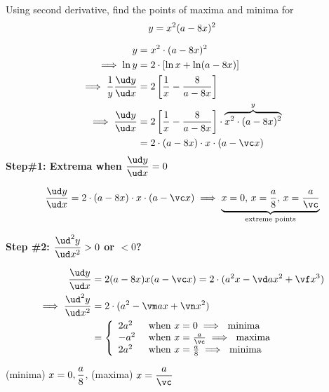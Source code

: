 

\MULTIPLY{}\vc
\MULTIPLY{}\vd
\MULTIPLY{}\vm
\SQUARE\vb\ve
\MULTIPLY{}\vf
\MULTIPLY{}\vn

\question[3] Using second derivative, find the points of maxima and minima for 
  \[ y=x^2(a-8 x)^2 \]

\watchout

\ifprintanswers
\fi 

\begin{solution}[\fullpage]
  \begin{align}
     y &= x^2\cdot(a-\vb x)^2 \\
     \implies \ln y &= 2\cdot \left[\ln x + \ln (a-\vb x)\right] \\
     \implies \dfrac{1}{y}\dfrac{\ud y}{\ud x} &= 2\left[ \dfrac{1}{x} - \dfrac{\vb}{a-\vb x}\right] \\
     \implies \dfrac{\ud y}{\ud x} &= 2\left[ \dfrac{1}{x} - \dfrac{\vb}{a-\vb x}\right]
                                         \cdot \overbrace{x^2\cdot (a-\vb x)^2}^{y} \\
                                      &= 2\cdot(a-\vb x)\cdot x \cdot (a-\vc x)
  \end{align}
  \textbf{Step\#1: Extrema when $\dfrac{\ud y}{\ud x} = 0$}

  \[ \dfrac{\ud y}{\ud x} = 2\cdot(a-\vb x)\cdot x \cdot (a-\vc x)
  \implies\underbrace{ x=0,\,x=\dfrac{a}\vb,\,x=\dfrac{a}\vc}_{\text{extreme points}} \]

  \textbf{Step \#2: $\dfrac{\ud^2 y}{\ud x^2} > 0$ or $<0$?} 
  
  \begin{align}
     \dfrac{\ud y}{\ud x} &= 2(a-\vb x)x(a-\vc x) 
            = 2\cdot(a^2x - \vd ax^2 + \vf x^3) \\
     \implies \dfrac{\ud^2 y}{\ud x^2} &= 2\cdot(a^2 - \vm ax + \vn x^2) \\
     &= \left\lbrace
        \begin{array}{l l}
          2a^2 & \text{ when } x = 0 \implies \text{ minima } \\
          -a^2 & \text{ when } x = \frac{a}{\vc} \implies \text{ maxima } \\
          2a^2 & \text{ when } x = \frac{a}{\vb} \implies \text{ minima }
        \end{array}\right.
  \end{align}
  
\end{solution}
\ifprintanswers\begin{codex}(minima) $x=0,\dfrac{a}{8}$, (maxima) $x=\dfrac{a}\vc$ \end{codex}\fi
